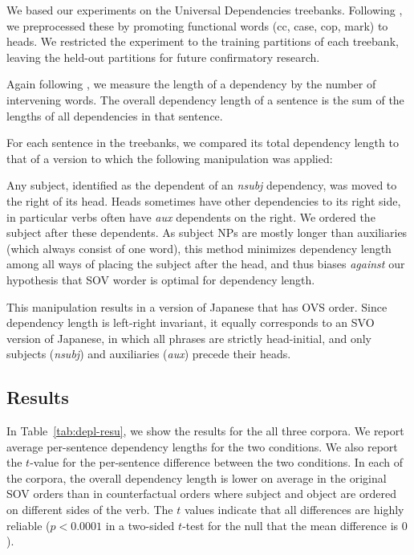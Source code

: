 \documentclass[11pt,a4paper]{article}
\begin{document}
We based our experiments on the Universal Dependencies treebanks.
Following \cite{futrell2015largescale}, we preprocessed these by promoting functional words (cc, case, cop, mark) to heads.
We restricted the experiment to the training partitions of each treebank, leaving the held-out partitions for future confirmatory research.

Again following \cite{futrell2015largescale}, we measure the length of a dependency by the number of intervening words.
The overall dependency length of a sentence is the sum of the lengths of all dependencies in that sentence.

For each sentence in the treebanks, we compared its total dependency length to that of a version to which the following manipulation was applied:

Any subject, identified as the dependent of an \textit{nsubj} dependency, was moved to the right of its head.
Heads sometimes have other dependencies to its right side, in particular verbs often have \textit{aux} dependents on the right.
We ordered the subject after these dependents.
As subject NPs are mostly longer than auxiliaries (which always consist of one word), this method minimizes dependency length among all ways of placing the subject after the head, and thus biases \emph{against} our hypothesis that SOV worder is optimal for dependency length.

This manipulation results in a version of Japanese that has OVS order.
Since dependency length is left-right invariant, it equally corresponds to an SVO version of Japanese, in which all phrases are strictly head-initial, and only subjects (\textit{nsubj}) and auxiliaries (\textit{aux}) precede their heads.


\subsection{Results}
In Table~\ref{tab:depl-resu}, we show the results for the all three corpora.
We report average per-sentence dependency lengths for the two conditions.
We also report the $t$-value for the per-sentence difference between the two conditions.
In each of the corpora, the overall dependency length is lower on average in the original SOV orders than in counterfactual orders where subject and object are ordered on different sides of the verb.
The $t$ values indicate that all differences are highly reliable ($p < 0.0001$ in a two-sided $t$-test for the null that the mean difference is $0$).
\end{document}

